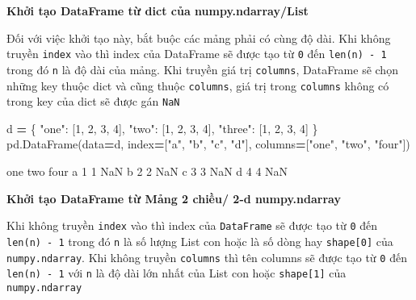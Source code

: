 \documentclass[
]{book}
\newenvironment{Shaded}{\begin{snugshade}}{\end{snugshade}}
\newcommand{\DecValTok}[1]{\textcolor[rgb]{0.00,0.00,0.81}{#1}}
\newcommand{\NormalTok}[1]{#1}
\newcommand{\OperatorTok}[1]{\textcolor[rgb]{0.81,0.36,0.00}{\textbf{#1}}}
\newcommand{\StringTok}[1]{\textcolor[rgb]{0.31,0.60,0.02}{#1}}
\begin{document}
\textbf{Khởi tạo DataFrame từ dict của numpy.ndarray/List}

Đối với việc khởi tạo này, bắt buộc các mảng phải có cùng độ dài. Khi không truyền \texttt{index} vào thì
index của DataFrame sẽ được tạo từ \texttt{0} đến \texttt{len(n)\ -\ 1} trong đó \texttt{n} là độ dài của mảng. Khi truyền
giá trị \texttt{columns}, DataFrame sẽ chọn những key thuộc dict và cũng thuộc \texttt{columns}, giá trị trong
\texttt{columns} không có trong key của dict sẽ được gán \texttt{NaN}

\begin{Shaded}
\begin{Highlighting}[]
\NormalTok{d }\OperatorTok{=}\NormalTok{ \{}
            \StringTok{"one"}\NormalTok{: [}\DecValTok{1}\NormalTok{, }\DecValTok{2}\NormalTok{, }\DecValTok{3}\NormalTok{, }\DecValTok{4}\NormalTok{],}
            \StringTok{"two"}\NormalTok{: [}\DecValTok{1}\NormalTok{, }\DecValTok{2}\NormalTok{, }\DecValTok{3}\NormalTok{, }\DecValTok{4}\NormalTok{],}
            \StringTok{"three"}\NormalTok{: [}\DecValTok{1}\NormalTok{, }\DecValTok{2}\NormalTok{, }\DecValTok{3}\NormalTok{, }\DecValTok{4}\NormalTok{]}
\NormalTok{        \}}
\NormalTok{pd.DataFrame(data}\OperatorTok{=}\NormalTok{d,}
\NormalTok{                     index}\OperatorTok{=}\NormalTok{[}\StringTok{"a"}\NormalTok{, }\StringTok{"b"}\NormalTok{, }\StringTok{"c"}\NormalTok{, }\StringTok{"d"}\NormalTok{],}
\NormalTok{                     columns}\OperatorTok{=}\NormalTok{[}\StringTok{"one"}\NormalTok{, }\StringTok{"two"}\NormalTok{, }\StringTok{"four"}\NormalTok{])}
\end{Highlighting}
\end{Shaded}

\begin{Shaded}
\begin{Highlighting}[]
\NormalTok{   one  two four}
\NormalTok{a    }\DecValTok{1}    \DecValTok{1}\NormalTok{   NaN}
\NormalTok{b    }\DecValTok{2}    \DecValTok{2}\NormalTok{   NaN}
\NormalTok{c    }\DecValTok{3}    \DecValTok{3}\NormalTok{   NaN}
\NormalTok{d    }\DecValTok{4}    \DecValTok{4}\NormalTok{   NaN}
\end{Highlighting}
\end{Shaded}

\textbf{Khởi tạo DataFrame từ Mảng 2 chiều/ 2-d numpy.ndarray}

Khi không truyền \texttt{index} vào thì index của \texttt{DataFrame} sẽ được tạo từ \texttt{0} đến \texttt{len(n)\ -\ 1} trong đó \texttt{n}
là số lượng List con hoặc là số dòng hay \texttt{shape{[}0{]}} của \texttt{numpy.ndarray}. Khi không truyền \texttt{columns}
thì tên columns sẽ được tạo từ \texttt{0} đến \texttt{len(n)\ -\ 1} với \texttt{n} là độ dài lớn nhất của List con hoặc \texttt{shape{[}1{]}}
của \texttt{numpy.ndarray}
\end{document}
